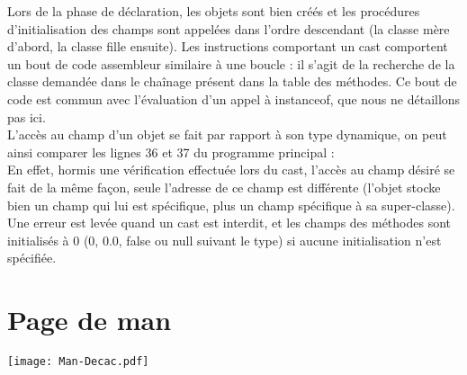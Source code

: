 \documentclass[11pt]{article}
\begin{document}
\hspace{1cm}Lors de la phase de déclaration, les objets sont bien créés et les procédures d'initialisation des champs sont appelées dans l'ordre descendant (la classe mère d'abord, la classe fille ensuite).
Les instructions comportant un cast comportent un bout de code assembleur similaire à une boucle : il s'agit de la recherche de la classe demandée dans le chaînage présent dans la table des méthodes.
Ce bout de code est commun avec l'évaluation d'un appel à instanceof, que nous ne détaillons pas ici. \\

\hspace{1cm}L'accès au champ d'un objet se fait par rapport à son type dynamique, on peut ainsi comparer les lignes 36 et 37 du programme principal : \\

En effet, hormis une vérification effectuée lors du cast, l'accès au champ désiré se fait de la même façon, seule l'adresse de ce champ est différente (l'objet stocke bien un champ qui lui est spécifique, plus un champ spécifique à sa super-classe). \\

\hspace{1cm}Une erreur est levée quand un cast est interdit, et les champs des méthodes sont initialisés à 0 (0, 0.0, false ou null suivant le type) si aucune initialisation n'est spécifiée.


\newpage


   \section{Page de man}
   {\texttt{[image: Man-Decac.pdf]}} 
\end{document}
